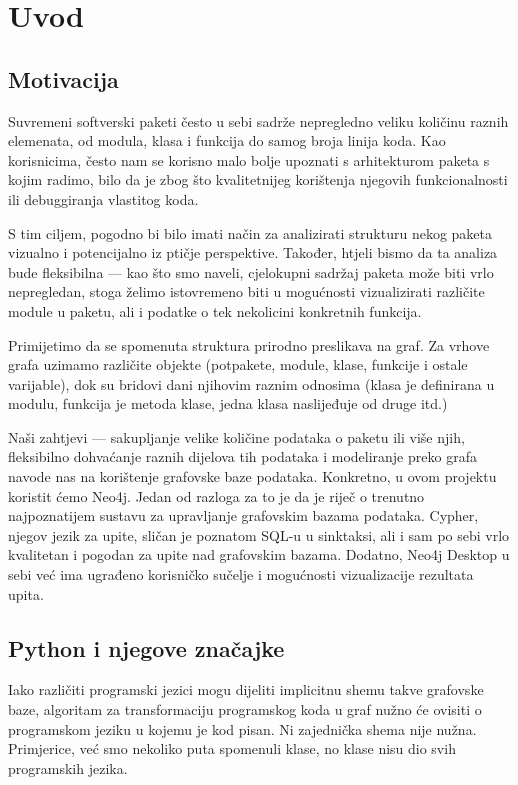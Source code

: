 \section{Uvod} \label{sec:uvod}
\subsection{Motivacija}
Suvremeni softverski paketi često u sebi sadrže nepregledno veliku količinu raznih elemenata, od modula, klasa i funkcija do samog broja linija koda. Kao korisnicima, često nam se korisno malo bolje upoznati s arhitekturom paketa s kojim radimo, bilo da je zbog što kvalitetnijeg korištenja njegovih funkcionalnosti ili debuggiranja vlastitog koda.


S tim ciljem, pogodno bi bilo imati način za analizirati strukturu nekog paketa vizualno i potencijalno iz ptičje perspektive.
 Također, htjeli bismo da ta analiza bude fleksibilna --- kao što smo naveli, cjelokupni sadržaj paketa može biti vrlo nepregledan, stoga želimo istovremeno biti u mogućnosti vizualizirati različite module u paketu, ali i podatke o tek nekolicini konkretnih funkcija.


Primijetimo da se spomenuta struktura prirodno preslikava na graf.
Za vrhove grafa uzimamo različite objekte (potpakete, module, klase, funkcije i ostale varijable), dok su bridovi dani njihovim raznim odnosima (klasa je definirana u modulu, funkcija je metoda klase, jedna klasa naslijeđuje od druge itd.) 


Naši zahtjevi --- sakupljanje velike količine podataka o paketu ili više
njih, fleksibilno dohvaćanje raznih dijelova tih podataka i
modeliranje preko grafa navode nas na korištenje grafovske baze podataka. Konkretno, u ovom projektu koristit ćemo Neo4j.
Jedan od razloga za to je da je riječ o trenutno najpoznatijem sustavu
za upravljanje grafovskim bazama podataka. Cypher, njegov jezik za upite,
sličan je poznatom SQL-u u sinktaksi, ali i sam po sebi vrlo kvalitetan i pogodan za upite nad grafovskim bazama.
Dodatno, Neo4j Desktop u sebi već ima ugrađeno korisničko sučelje i
mogućnosti vizualizacije rezultata upita.


\subsection{Python i njegove značajke}
Iako različiti programski jezici mogu dijeliti implicitnu shemu takve
grafovske baze, algoritam za transformaciju programskog koda u graf 
nužno će ovisiti o programskom jeziku u kojemu je kod pisan.
Ni zajednička shema nije nužna. Primjerice, već smo nekoliko puta spomenuli klase, no klase nisu dio svih programskih jezika.


